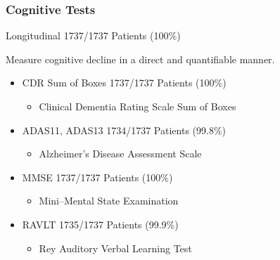 \documentclass{beamer}
\begin{document}
    \begin{frame}
        \frametitle{Cognitive Tests}
        Longitudinal \hfill 1737/1737 Patients (100\%)\\
        \vspace{0.2in}

        Measure cognitive decline in a direct and quantifiable manner.
        \vspace{0.2in}
        \begin{itemize}
            \item CDR Sum of Boxes \hfill 1737/1737 Patients (100\%)
                \begin{itemize}
                    \item Clinical Dementia Rating Scale Sum of Boxes
                \end{itemize}
            \item ADAS11, ADAS13 \hfill 1734/1737 Patients (99.8\%)
                \begin{itemize}
                    \item Alzheimer’s Disease Assessment Scale
                \end{itemize}
            \item MMSE \hfill 1737/1737 Patients (100\%)
                \begin{itemize}
                    \item Mini–Mental State Examination
                \end{itemize}
            \item RAVLT \hfill 1735/1737 Patients (99.9\%)
                \begin{itemize}
                    \item Rey Auditory Verbal Learning Test
                \end{itemize}
        \end{itemize}
    \end{frame}
\end{document}
